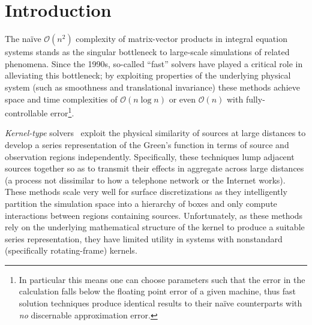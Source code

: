 \section{Introduction}

The na\"ive $\mathcal{O}(n^2)$ complexity of matrix-vector products in integral equation systems stands as the singular bottleneck to large-scale simulations of related phenomena.
Since the 1990s, so-called ``fast'' solvers have played a critical role in alleviating this bottleneck; by exploiting properties of the underlying physical system (such as smoothness and translational invariance) these methods achieve space and time complexities of $\mathcal{O}(n \log n)$ or even $\mathcal{O}(n)$ with fully-controllable error\footnote{In particular this means one can choose parameters such that the error in the calculation falls below the floating point error of a given machine, thus fast solution techniques produce identical results to their na\"ive counterparts with \emph{no} discernable approximation error.}.

\emph{Kernel-type} solvers~\cite{Greengard1987,PWTD} exploit the physical similarity of sources at large distances to develop a series representation of the Green's function in terms of source and observation regions independently.
Specifically, these techniques lump adjacent sources together so as to transmit their effects in aggregate across large distances (a process not dissimilar to how a telephone network or the Internet works).
These methods scale very well for surface discretizations as they intelligently partition the simulation space into a hierarchy of boxes and only compute interactions between regions containing sources.
Unfortunately, as these methods rely on the underlying mathematical structure of the kernel to produce a suitable series representation, they have limited utility in systems with nonstandard (specifically rotating-frame) kernels.

